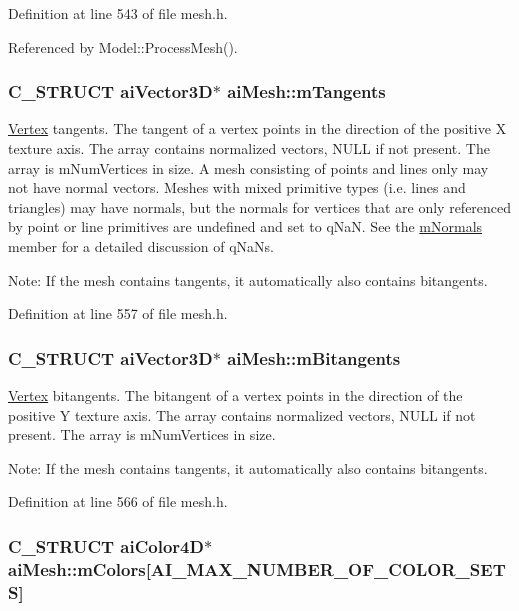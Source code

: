 Definition at line 543 of file mesh.h.

Referenced by Model::ProcessMesh().\hypertarget{structai_mesh_f367ff78bd69f3e83d7edc8ad67dc5df}{
\subsubsection[mTangents]{\setlength{\rightskip}{0pt plus 5cm}C\_\-STRUCT aiVector3D$\ast$ {\bf aiMesh::mTangents}}}
\label{structai_mesh_f367ff78bd69f3e83d7edc8ad67dc5df}


\hyperlink{class_vertex}{Vertex} tangents. The tangent of a vertex points in the direction of the positive X texture axis. The array contains normalized vectors, NULL if not present. The array is mNumVertices in size. A mesh consisting of points and lines only may not have normal vectors. Meshes with mixed primitive types (i.e. lines and triangles) may have normals, but the normals for vertices that are only referenced by point or line primitives are undefined and set to qNaN. See the \hyperlink{structai_mesh_ec81b496b4d93838cef038933dabe9b9}{mNormals} member for a detailed discussion of qNaNs. \begin{Desc}
\item[Note:]If the mesh contains tangents, it automatically also contains bitangents. \end{Desc}


Definition at line 557 of file mesh.h.\hypertarget{structai_mesh_b2a81bfe1731f01271ebab274a8f01c4}{
\subsubsection[mBitangents]{\setlength{\rightskip}{0pt plus 5cm}C\_\-STRUCT aiVector3D$\ast$ {\bf aiMesh::mBitangents}}}
\label{structai_mesh_b2a81bfe1731f01271ebab274a8f01c4}


\hyperlink{class_vertex}{Vertex} bitangents. The bitangent of a vertex points in the direction of the positive Y texture axis. The array contains normalized vectors, NULL if not present. The array is mNumVertices in size. \begin{Desc}
\item[Note:]If the mesh contains tangents, it automatically also contains bitangents. \end{Desc}


Definition at line 566 of file mesh.h.\hypertarget{structai_mesh_d9215f67bd0c2277b10775a8adb66b96}{
\subsubsection[mColors]{\setlength{\rightskip}{0pt plus 5cm}C\_\-STRUCT aiColor4D$\ast$ {\bf aiMesh::mColors}\mbox{[}AI\_\-MAX\_\-NUMBER\_\-OF\_\-COLOR\_\-SETS\mbox{]}}}
\label{structai_mesh_d9215f67bd0c2277b10775a8adb66b96}


